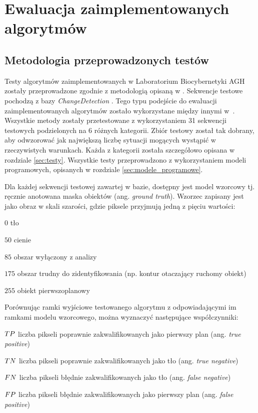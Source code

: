 \chapter{Ewaluacja zaimplementowanych algorytmów}
\label{cha:ewaluacja}

\section{Metodologia przeprowadzonych testów}
\label{sec:metodologia_testow}

Testy algorytmów zaimplementowanych w Laboratorium Biocybernetyki AGH zostały przeprowadzone zgodnie z metodologią opisaną w \cite{changedetection_15}. 
Sekwencje testowe pochodzą z bazy \textit{ChangeDetection} \cite{change_detection_web}. 
Tego typu podejście do ewaluacji zaimplementowanych algorytmów zostało wykorzystane między innymi w~\cite{janus_15, kryjak_14_pbas, kryjak_14_vibe}. 
Wszystkie metody zostały przetestowane z wykorzystaniem 31 sekwencji testowych podzielonych na 6 różnych kategorii. 
Zbiór testowy został tak dobrany, aby odwzorować jak największą liczbę sytuacji mogących wystąpić w rzeczywistych warunkach. 
Każda z kategorii została szczegółowo opisana w rozdziale \ref{sec:testy}. 
Wszystkie testy przeprowadzono z wykorzystaniem modeli programowych, opisanych w rozdziale \ref{sec:modele_programowe}.

Dla każdej sekwencji testowej zawartej w bazie, dostępny jest model wzorcowy tj. ręcznie anotowana maska obiektów (ang. \textit{ground truth}).
Wzorzec zapisany jest jako obraz w skali szarości, gdzie piksele przyjmują jedną z pięciu wartości:

\begin{eqwhere}[2cm]
	\item[$0$] tło
	\item[$50$] cienie
	\item[$85$] obszar wyłączony z analizy
	\item [$175$] obszar trudny do zidentyfikowania (np. kontur otaczający ruchomy obiekt)
	\item [$255$] obiekt pierwszoplanowy \\
\end{eqwhere}  

\noindent Porównując ramki wyjściowe testowanego algorytmu z odpowiadającymi im ramkami modelu wzorcowego, można wyznaczyć następujące współczynniki:
\begin{eqwhere}[2cm]
	\item[$\small TP$] liczba pikseli poprawnie zakwalifikowanych jako pierwszy plan (ang. \textit{true positive})
	\item[$\small TN$] liczba pikseli poprawnie zakwalifikowanych jako tło (ang. \textit{true negative})
	\item[$\small FN$] liczba pikseli błędnie zakwalifikowanych jako tło (ang. \textit{false negative})
	\item[$\small FP$] liczba pikseli błędnie zakwalifikowanych jako pierwszy plan (ang. \textit{false positive})\\
\end{eqwhere}

